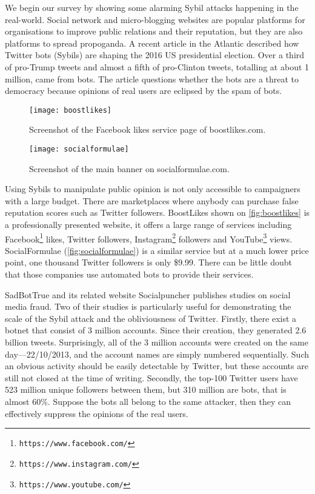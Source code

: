 We begin our survey by showing some alarming Sybil attacks happening in the
real-world. Social network and micro-blogging websites are popular platforms for
organisations to improve public relations and their reputation, but they are
also platforms to spread propoganda. A recent article in the Atlantic described
how Twitter bots (Sybils) are shaping the 2016 US presidential
election\cite{atlantictwitterbots}. Over a third of pro-Trump tweets and almost
a fifth of pro-Clinton tweets, totalling at about 1 million, came from bots. The
article questions whether the bots are a threat to democracy because opinions of
real users are eclipsed by the spam of bots.

\begin{figure}
  \centering
  \texttt{[image: boostlikes]}
  \caption{Screenshot of the Facebook likes service page of boostlikes.com.}
  \label{fig:boostlikes}
\end{figure}

\begin{figure*}
  \centering
  \texttt{[image: socialformulae]}
  \caption{Screenshot of the main banner on socialformulae.com.}
  \label{fig:socialformulae}
\end{figure*}

Using Sybils to manipulate public opinion is not only accessible to campaigners
with a large budget. There are marketplaces where anybody can purchase false
reputation scores such as Twitter followers. BoostLikes shown on
\autoref{fig:boostlikes} is a professionally presented website, it offers a
large range of services including
Facebook\footnote{\texttt{https://www.facebook.com/}} likes, Twitter followers,
Instagram\footnote{\texttt{https://www.instagram.com/}} followers and
YouTube\footnote{\texttt{https://www.youtube.com/}} views. SocialFormulae
(\autoref{fig:socialformulae}) is a similar service but at a much lower price
point, one thousand Twitter followers is only \$9.99. There can be little doubt
that those companies use automated bots to provide their services.

SadBotTrue and its related website Socialpuncher publishes studies on social
media fraud. Two of their studies is particularly useful for demonstrating the
scale of the Sybil attack and the obliviousness of Twitter. Firstly, there exist
a botnet that consist of 3 million accounts. Since their creation, they
generated 2.6 billion tweets. Surprisingly, all of the 3 million accounts were
created on the same day---22/10/2013, and the account names are simply
numbered sequentially\cite{sadbottrue}. Such an obvious activity should be
easily detectable by Twitter, but these accounts are still not closed at the
time of writing. Secondly, the top-100 Twitter users have 523 million unique
followers between them, but 310 million are bots, that is almost
60\%\cite{socialpuncher}. Suppose the bots all belong to the same attacker, then
they can effectively suppress the opinions of the real users.

